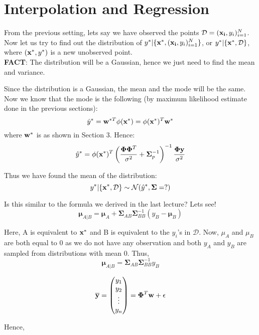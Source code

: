 \documentclass[12pt]{article}
\begin{document}
\section{Interpolation and Regression}

From the previous setting, lets say we have observed the points $\mathcal{D} = (\bold{x_i},y_i)_{i=1}^N$.\\

\noindent Now let us try to find out the distribution of $y^*|\{\bold{x}^*,(\bold{x_i},y_i)_{i=1}^N\}$, or $y^*|\{\bold{x}^*,\mathcal{D}\}$, where $(\bold{x}^*,y^*)$ is a new unobserved point.\\

\noindent \textbf{FACT}: The distribution will be a Gaussian, hence we just need to find the mean and variance.

\noindent Since the distribution is a Gaussian, the mean and the mode will be the same. Now we know that the mode is the following (by maximum likelihood estimate done in the previous sections):
\[\hat{y}^* = \bold{w}^{*T}\phi(\bold{x}^*) = \phi(\bold{x}^*)^T\bold{w}^*\]
where $\bold{w}^*$ is as shown in Section 3. Hence:
\[\hat{y}^* = \phi(\bold{x}^*)^T\left(\frac{\bold{\Phi}\bold{\Phi}^T}{\sigma^2}+\bold{\Sigma}_p^{-1}\right)^{-1}\frac{\bold{\Phi}\bold{y}}{\sigma^2}\]

\noindent Thus we have found the mean of the distribution:
\[y^*|\{\bold{x}^*,\mathcal{D}\} \sim \mathcal{N}(\hat{y}^*,\bold{\Sigma} = ?)\]

\noindent Is this similar to the formula we derived in the last lecture? Lets see!
\[\boldsymbol{\mu}_{A|B} = \boldsymbol{\mu}_A + \boldsymbol{\Sigma}_{AB} \boldsymbol{\Sigma}_{BB}^{-1} (y_B - \boldsymbol{\mu}_B)\]

\noindent Here, A is equivalent to $\bold{x}^*$ and B is equivalent to the $y_i$'s in $\mathcal{D}$. Now, $\mu_A$ and $\mu_B$ are both equal to 0 as we do not have any observation and both $y_A$ and $y_B$ are sampled from distributions with mean 0. Thus,
\[\boldsymbol{\mu}_{A|B} = \boldsymbol{\Sigma}_{AB} \boldsymbol{\Sigma}_{BB}^{-1} y_B\]

\[
	\bold{\overline y} = \begin{pmatrix} y_1 \\ y_2 \\ \vdots \\ y_n \end{pmatrix} = \bold{\Phi}^T \bold{w} + \epsilon
\]

\noindent Hence, 
\end{document}
